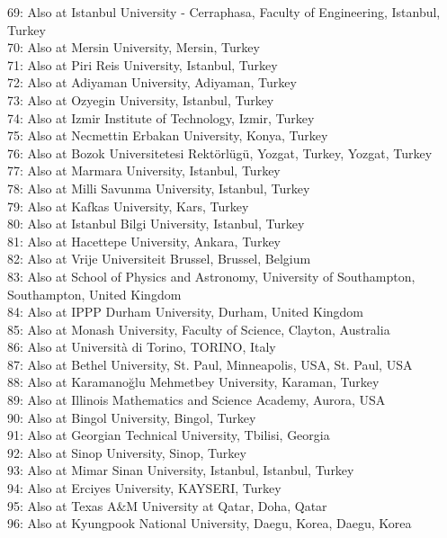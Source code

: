 69: Also at Istanbul University - Cerraphasa, Faculty of Engineering, Istanbul, Turkey\\
70: Also at Mersin University, Mersin, Turkey\\
71: Also at Piri Reis University, Istanbul, Turkey\\
72: Also at Adiyaman University, Adiyaman, Turkey\\
73: Also at Ozyegin University, Istanbul, Turkey\\
74: Also at Izmir Institute of Technology, Izmir, Turkey\\
75: Also at Necmettin Erbakan University, Konya, Turkey\\
76: Also at Bozok Universitetesi Rekt\"{o}rl\"{u}g\"{u}, Yozgat, Turkey, Yozgat, Turkey\\
77: Also at Marmara University, Istanbul, Turkey\\
78: Also at Milli Savunma University, Istanbul, Turkey\\
79: Also at Kafkas University, Kars, Turkey\\
80: Also at Istanbul Bilgi University, Istanbul, Turkey\\
81: Also at Hacettepe University, Ankara, Turkey\\
82: Also at Vrije Universiteit Brussel, Brussel, Belgium\\
83: Also at School of Physics and Astronomy, University of Southampton, Southampton, United Kingdom\\
84: Also at IPPP Durham University, Durham, United Kingdom\\
85: Also at Monash University, Faculty of Science, Clayton, Australia\\
86: Also at Universit\`{a} di Torino, TORINO, Italy\\
87: Also at Bethel University, St. Paul, Minneapolis, USA, St. Paul, USA\\
88: Also at Karamano\u{g}lu Mehmetbey University, Karaman, Turkey\\
89: Also at Illinois Mathematics and Science Academy, Aurora, USA\\
90: Also at Bingol University, Bingol, Turkey\\
91: Also at Georgian Technical University, Tbilisi, Georgia\\
92: Also at Sinop University, Sinop, Turkey\\
93: Also at Mimar Sinan University, Istanbul, Istanbul, Turkey\\
94: Also at Erciyes University, KAYSERI, Turkey\\
95: Also at Texas A\&M University at Qatar, Doha, Qatar\\
96: Also at Kyungpook National University, Daegu, Korea, Daegu, Korea\\
